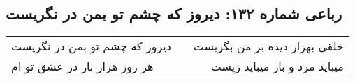 \begin{center}
\section*{رباعی شماره ۱۳۲: دیروز که چشم تو بمن در نگریست}
\label{sec:sh132}
\begin{longtable}{l p{0.5cm} r}
دیروز که چشم تو بمن در نگریست
&&
خلقی بهزار دیده بر من بگریست
\\
هر روز هزار بار در عشق تو ام
&&
میباید مرد و باز میباید زیست
\\
\end{longtable}
\end{center}

